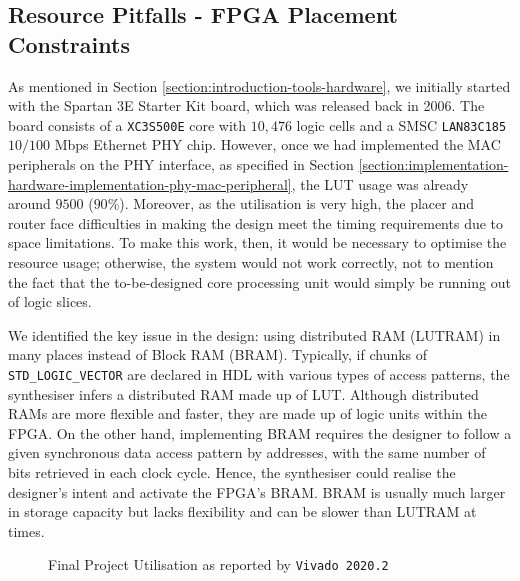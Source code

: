 \documentclass[a4paper]{report}
\newcommand{\code}{\texttt}
\begin{document}
\subsection{Resource Pitfalls - FPGA Placement Constraints}

As mentioned in Section \ref{section:introduction-tools-hardware}, we initially started with the Spartan 3E Starter Kit board, which was released back in 2006. The board consists of a \code{XC3S500E} core with $10,476$ logic cells \cite{xilinx-documentation-2011-core} and a SMSC \code{LAN83C185} $10/100$ Mbps Ethernet PHY chip. However, once we had implemented the MAC peripherals on the PHY interface, as specified in Section \ref{section:implementation-hardware-implementation-phy-mac-peripheral}, the LUT usage was already around $9500$ ($90\%$). Moreover, as the utilisation is very high, the placer and router face difficulties in making the design meet the timing requirements due to space limitations. To make this work, then, it would be necessary to optimise the resource usage; otherwise, the system would not work correctly, not to mention the fact that the to-be-designed core processing unit would simply be running out of logic slices. 

We identified the key issue in the design: using distributed RAM (LUTRAM) in many places instead of Block RAM (BRAM). Typically, if chunks of \code{STD\_LOGIC\_VECTOR} are declared in HDL with various types of access patterns, the synthesiser infers a distributed RAM made up of LUT. Although distributed RAMs are more flexible and faster, they are made up of logic units within the FPGA. On the other hand, implementing BRAM requires the designer to follow a given synchronous data access pattern by addresses, with the same number of bits retrieved in each clock cycle. Hence, the synthesiser could realise the designer's intent and activate the FPGA's BRAM. BRAM is usually much larger in storage capacity but lacks flexibility and can be slower than LUTRAM at times. 

\begin{figure}[h!]
  \caption{Final Project Utilisation as reported by \code{Vivado 2020.2}}
  \label{fig:utilisation-fpga}
\end{figure}
\end{document}
